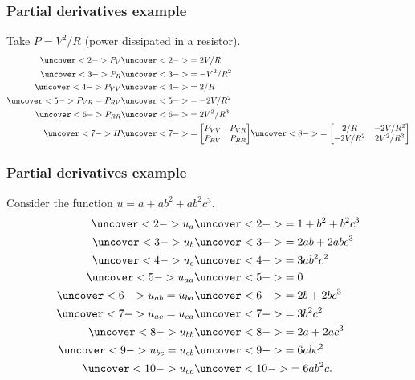 \documentclass[9pt]{beamer}
\begin{document}
\begin{frame}[t]
 \frametitle{Partial derivatives example}
 Take $P=V^2/R$ (power dissipated in a resistor).
 \begin{align*}
  \uncover<2->{P_V} &\uncover<2->{= 2V/R} \\
  \uncover<3->{P_R} &\uncover<3->{= -V^2/R^2} \\
  \uncover<4->{P_{VV}} &\uncover<4->{= 2/R} \\
  \uncover<5->{P_{VR}=P_{RV}} &\uncover<5->{= -2V/R^2} \\
  \uncover<6->{P_{RR}} &\uncover<6->{= 2V^2/R^3} \\
  \uncover<7->{H} &\uncover<7->{= \bbm P_{VV} & P_{VR} \\ P_{RV} & P_{RR} \ebm }
     \uncover<8->{= \bbm 2/R & -2V/R^2 \\ -2V/R^2 & 2V^2/R^3 \ebm}
 \end{align*}
\end{frame}

\begin{frame}[t]
 \frametitle{Partial derivatives example}
 Consider the function $u=a+ab^2+ab^2c^3$.
 \begin{align*}
  \uncover<2->{u_a} &\uncover<2->{= 1+b^2+b^2c^3} \\
  \uncover<3->{u_b} &\uncover<3->{= 2ab+2abc^3} \\
  \uncover<4->{u_c} &\uncover<4->{= 3ab^2c^2} \\
  \uncover<5->{u_{aa}         } &\uncover<5->{= 0} \\
  \uncover<6->{u_{ab} = u_{ba}} &\uncover<6->{= 2b+2bc^3} \\
  \uncover<7->{u_{ac} = u_{ca}} &\uncover<7->{= 3b^2c^2} \\
  \uncover<8->{u_{bb}         } &\uncover<8->{= 2a+2ac^3} \\
  \uncover<9->{u_{bc} = u_{cb}} &\uncover<9->{= 6abc^2} \\
  \uncover<10->{u_{cc}         } &\uncover<10->{= 6ab^2c.}
 \end{align*}
\end{frame}
\end{document}

